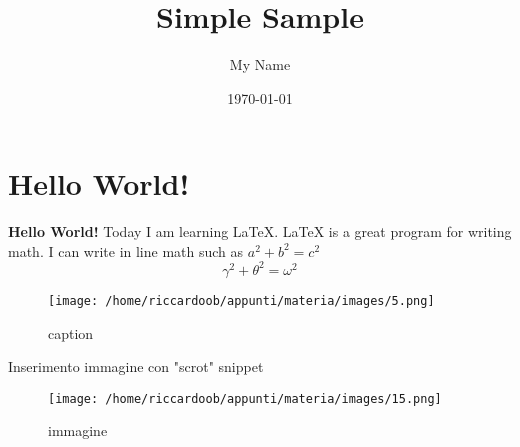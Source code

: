 \documentclass{article}
\title{Simple Sample}
\author{My Name}
\date{\today}
\begin{document}
    \maketitle    
    \section{Hello World!}    
    \textbf{Hello World!} Today I am learning \LaTeX.
     \LaTeX{} is a great program for writing math. I can write in line math such as $a^2+b^2=c^2$
    \begin{equation}
    	\gamma^2+\theta^2=\omega^2
    \end{equation}

\begin{figure}[h]
	\caption{caption}
	\centering
	\texttt{[image: /home/riccardoob/appunti/materia/images/5.png]}
\end{figure}

Inserimento immagine con "scrot" snippet 
\begin{figure}[h]
	\caption{immagine}
	\centering
	\texttt{[image: /home/riccardoob/appunti/materia/images/15.png]}
\end{figure}
\end{document}
